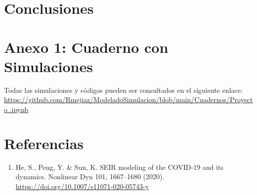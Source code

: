 \documentclass[conference]{IEEEtran}
\begin{document}
\section{Conclusiones}


\section*{Anexo 1: Cuaderno con Simulaciones}

Todas las simulaciones y códigos pueden ser consultados en el siguiente enlace: \href{https://github.com/Rmejiaz/ModeladoSimulacion/blob/main/Cuadernos/Proyecto.ipynb}{https://github.com/Rmejiaz/ModeladoSimulacion/blob/main/Cuadernos/Proyecto
.ipynb}


\section{Referencias}

\begin{enumerate}
    \item He, S., Peng, Y. \& Sun, K. SEIR modeling of the COVID-19 and its dynamics. Nonlinear Dyn 101, 1667–1680 (2020). \href{https://doi.org/10.1007/s11071-020-05743-y}{https://doi.org/10.1007/s11071-020-05743-y}
\end{enumerate}
\end{document}
